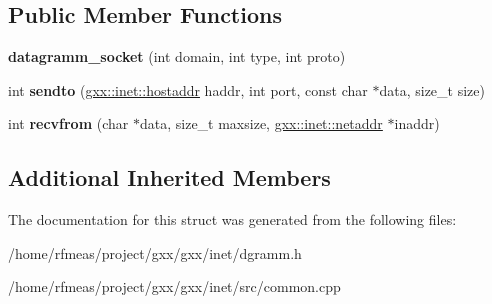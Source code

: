 \subsection*{Public Member Functions}
\begin{DoxyCompactItemize}
\item 
{\bfseries datagramm\+\_\+socket} (int domain, int type, int proto)\hypertarget{structgxx_1_1inet_1_1datagramm__socket_a9439e5f734cec85e17b1b2f4bf1db4d1}{}\label{structgxx_1_1inet_1_1datagramm__socket_a9439e5f734cec85e17b1b2f4bf1db4d1}

\item 
int {\bfseries sendto} (\hyperlink{classgxx_1_1hostaddr}{gxx\+::inet\+::hostaddr} haddr, int port, const char $\ast$data, size\+\_\+t size)\hypertarget{structgxx_1_1inet_1_1datagramm__socket_a28e77b93fd7040079e4cb9353ad263b3}{}\label{structgxx_1_1inet_1_1datagramm__socket_a28e77b93fd7040079e4cb9353ad263b3}

\item 
int {\bfseries recvfrom} (char $\ast$data, size\+\_\+t maxsize, \hyperlink{structgxx_1_1inet_1_1netaddr}{gxx\+::inet\+::netaddr} $\ast$inaddr)\hypertarget{structgxx_1_1inet_1_1datagramm__socket_a8459652652779265adac1180afb12749}{}\label{structgxx_1_1inet_1_1datagramm__socket_a8459652652779265adac1180afb12749}

\end{DoxyCompactItemize}
\subsection*{Additional Inherited Members}


The documentation for this struct was generated from the following files\+:\begin{DoxyCompactItemize}
\item 
/home/rfmeas/project/gxx/gxx/inet/dgramm.\+h\item 
/home/rfmeas/project/gxx/gxx/inet/src/common.\+cpp\end{DoxyCompactItemize}
